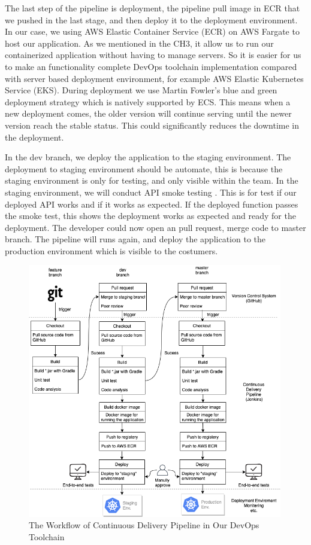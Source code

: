 \par
\label{deploy}
The last step of the pipeline is deployment, the pipeline pull image in ECR that we pushed in the last stage, and then deploy it to the deployment environment. In our case, we using AWS Elastic Container Service (ECR) on AWS Fargate to host our application. As we mentioned in the CH3, it allow us to run our containerized application without having to manage servers. So it is easier for us to make an functionality complete DevOps toolchain implementation compared with server based deployment environment, for example AWS Elastic Kubernetes Service (EKS). 
During deployment we use Martin Fowler's blue and green deployment strategy \cite{fowler2010bluegreendeployment} which is natively supported by ECS. This means when a new deployment comes, the older version will continue serving until the newer version reach the stable status. This could significantly reduces the downtime in the deployment. 
\par
In the dev branch, we deploy the application to the staging environment. The deployment to staging environment should be automate, this is because the staging environment is only for testing, and only visible within the team. 
In the staging environment, we will conduct API smoke testing \cite{Smoketes27:online}. This is for test if our deployed API works and if it works as expected. If the deployed function passes the smoke test, this shows the deployment works as expected and ready for the deployment. The developer could now open an pull request, merge code to master branch. The pipeline will runs again, and deploy the application to the production environment which is visible to the costumers.
\begin{figure}[h]
    \centering
    \includegraphics[width=0.99\textwidth]{pics/pipeline.png}
    \caption{The Workflow of Continuous Delivery Pipeline in Our DevOps Toolchain}
    \label{fig:pipeline}
\end{figure}

